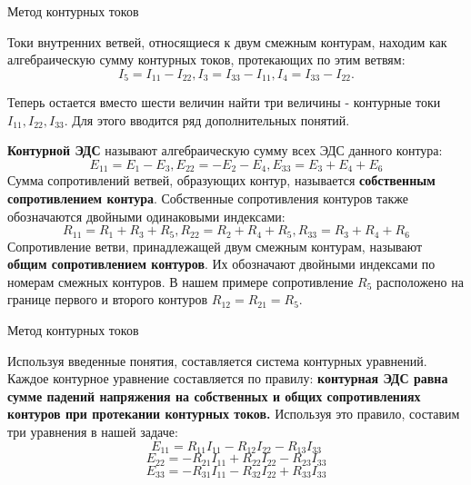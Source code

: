 \documentclass[10pt, pdf, hyperref={unicode},handout]{beamer}
\begin{document}
\begin{frame}{Метод контурных токов}
  \begin{block}

    \small{
      Токи внутренних ветвей, относящиеся к двум смежным контурам, находим как алгебраическую сумму контурных токов, протекающих по этим ветвям:
      $$I_5=I_{11}-I_{22}, I_3=I_{33}-I_{11}, I_4=I_{33}-I_{22}.$$

      Теперь остается вместо шести величин найти три величины - контурные токи $I_{11},I_{22},I_{33}$. Для этого вводится ряд дополнительных понятий.

      \textbf{Контурной ЭДС} называют алгебраическую сумму всех ЭДС данного контура:
      $$E_{11}=E_1-E_3, E_{22}=-E_2-E_4, E_{33}=E_3+E_4+E_6$$
      Сумма сопротивлений ветвей, образующих контур, называется \textbf{собственным сопротивлением контура}. Собственные сопротивления контуров также обозначаются двойными одинаковыми индексами:
      $$R_{11}=R_1+R_3+R_5, R_{22}=R_2+R_4+R_5, R_{33}=R_3+R_4+R_6$$
      Сопротивление ветви, принадлежащей двум смежным контурам, называют \textbf{общим сопротивлением контуров}. Их обозначают двойными индексами по номерам смежных контуров. В нашем примере сопротивление $R_5$ расположено на границе первого и второго контуров $R_{12}=R_{21}=R_5$.
      }
  \end{block}
  
\end{frame}

\begin{frame}{Метод контурных токов}
  \begin{block}

    \small{
      Используя введенные понятия, составляется система контурных уравнений. Каждое контурное уравнение составляется по правилу: \textbf{контурная ЭДС равна сумме падений напряжения на собственных и общих сопротивлениях контуров при протекании контурных токов.}
      Используя это правило, составим три уравнения в нашей задаче:
      $$E_{11}=R_{11}I_{11}-R_{12}I_{22}-R_{13}I_{33}$$
      $$E_{22}=-R_{21}I_{11}+R_{22}I_{22}-R_{23}I_{33}$$
      $$E_{33}=-R_{31}I_{11}-R_{32}I_{22}+R_{33}I_{33}$$
      }
  \end{block}
  
\end{frame}
\end{document}
